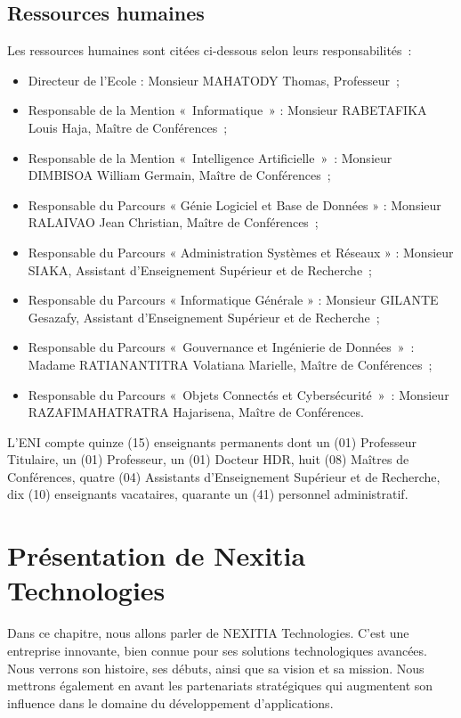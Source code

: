 \documentclass[12pt]{report}
\begin{document}
				\section{Ressources humaines}

				\hspace{15pt} Les ressources humaines sont citées ci-dessous selon leurs responsabilités :

				\begin{itemize}
					\item Directeur de l’Ecole : Monsieur MAHATODY Thomas, Professeur ;
					\item Responsable de la Mention « Informatique » : Monsieur RABETAFIKA Louis Haja, Maître de Conférences ;
					\item Responsable de la Mention « Intelligence Artificielle » : Monsieur DIMBISOA William Germain, Maître de Conférences ;
					\item Responsable du Parcours « Génie Logiciel et Base de Données » : Monsieur RALAIVAO Jean Christian, Maître de Conférences ;
					\item Responsable du Parcours « Administration Systèmes et Réseaux » : Monsieur SIAKA, Assistant d’Enseignement Supérieur et de Recherche ;
					\item Responsable du Parcours « Informatique Générale » : Monsieur GILANTE Gesazafy, Assistant d’Enseignement Supérieur et de Recherche ;
					\item Responsable du Parcours « Gouvernance et Ingénierie de Données » : Madame RATIANANTITRA Volatiana Marielle, Maître de Conférences ;
					\item Responsable du Parcours « Objets Connectés et Cybersécurité » : Monsieur RAZAFIMAHATRATRA Hajarisena, Maître de Conférences.
				\end{itemize}

				L’ENI compte quinze (15) enseignants permanents dont un (01) Professeur Titulaire, un (01) Professeur, un (01) Docteur HDR, huit (08) Maîtres de Conférences, quatre (04) Assistants d’Enseignement Supérieur et de Recherche, dix (10) enseignants vacataires, quarante un (41) personnel administratif.





				\chapter{Présentation de Nexitia Technologies}

				\hspace{15pt} Dans ce chapitre, nous allons parler de NEXITIA Technologies. C'est une entreprise innovante, bien connue pour ses solutions technologiques avancées. Nous verrons son histoire, ses débuts, ainsi que sa vision et sa mission. Nous mettrons également en avant les partenariats stratégiques qui augmentent son influence dans le domaine du développement d'applications.
\end{document}
